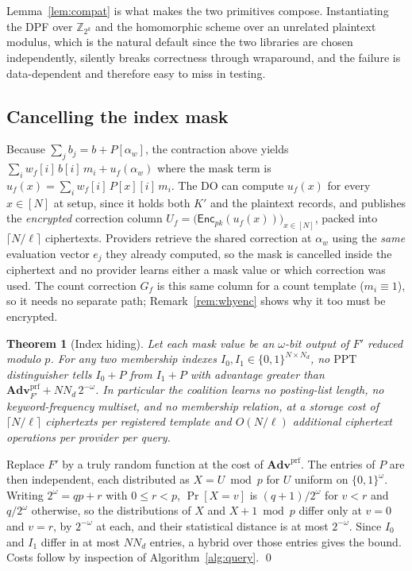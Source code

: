 \documentclass[a4paper,fleqn]{cas-dc}
\newtheorem{theorem}{Theorem}
\newcommand{\PPT}{\mathrm{PPT}}
\newcommand{\Enc}{\mathsf{Enc}}
\newcommand{\advPRF}{\mathbf{Adv}^{\mathrm{prf}}}
\begin{document}
Lemma~\ref{lem:compat} is what makes the two primitives compose. Instantiating
the DPF over $\mathbb{Z}_{2^k}$ and the homomorphic scheme over an unrelated
plaintext modulus, which is the natural default since the two libraries are
chosen independently, silently breaks correctness through wraparound, and the
failure is data-dependent and therefore easy to miss in testing.

\subsection{Cancelling the index mask}
\label{sec:mask}
Because $\sum_j b_j = b + P[\alpha_w]$, the contraction above yields
$\sum_{i} w_f[i]\,b[i]\,m_i + u_f(\alpha_w)$ where the mask term is
$u_f(x)=\sum_{i} w_f[i]\,P[x][i]\,m_i$. The DO can compute $u_f(x)$ for every
$x\in[N]$ at setup, since it holds both $K'$ and the plaintext records, and
publishes the \emph{encrypted} correction column
$U_f = \big(\Enc_{pk}(u_f(x))\big)_{x\in[N]}$, packed into
$\lceil N/\ell\rceil$ ciphertexts. Providers retrieve the shared correction at
$\alpha_w$ using the \emph{same} evaluation vector $e_j$ they already
computed, so the mask is cancelled inside the ciphertext and no provider
learns either a mask value or which correction was used. The count correction
$G_f$ is this same column for a count template ($m_i\equiv1$), so it needs no
separate path; Remark~\ref{rem:whyenc} shows why it too must be encrypted.

\begin{theorem}[Index hiding]
\label{thm:mask}
Let each mask value be an $\omega$-bit output of $F'$ reduced modulo $p$. For
any two membership indexes $I_0,I_1\in\{0,1\}^{N\times N_d}$, no $\PPT$
distinguisher tells $I_0+P$ from $I_1+P$ with advantage greater than
$\advPRF_{F'}+N N_d\,2^{-\omega}$. In particular the coalition learns no
posting-list length, no keyword-frequency multiset, and no membership
relation, at a storage cost of $\lceil N/\ell\rceil$ ciphertexts per
registered template and $O(N/\ell)$ additional ciphertext operations per
provider per query.
\end{theorem}
\begin{pf}
Replace $F'$ by a truly random function at the cost of $\advPRF$. The entries
of $P$ are then independent, each distributed as $X=U\bmod p$ for $U$ uniform
on $\{0,1\}^\omega$. Writing $2^\omega=qp+r$ with $0\le r<p$, $\Pr[X=v]$ is
$(q+1)/2^\omega$ for $v<r$ and $q/2^\omega$ otherwise, so the distributions of
$X$ and $X+1\bmod p$ differ only at $v=0$ and $v=r$, by $2^{-\omega}$ at each,
and their statistical distance is at most $2^{-\omega}$. Since $I_0$ and $I_1$
differ in at most $N N_d$ entries, a hybrid over those entries gives the
bound. Costs follow by inspection of Algorithm~\ref{alg:query}. \qed
\end{pf}
\end{document}
